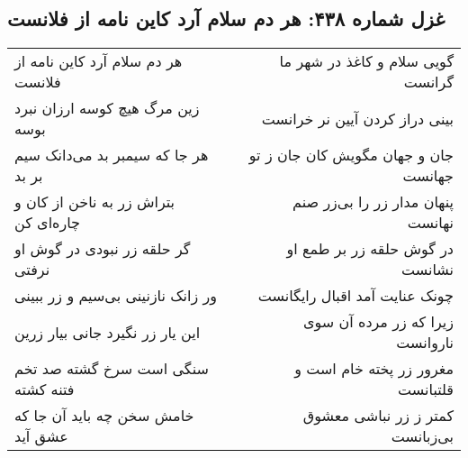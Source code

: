 \begin{center}
\section*{غزل شماره ۴۳۸: هر دم سلام آرد کاین نامه از فلانست}
\label{sec:0438}
\begin{longtable}{l p{0.5cm} r}
هر دم سلام آرد کاین نامه از فلانست
&&
گویی سلام و کاغذ در شهر ما گرانست
\\
زین مرگ هیچ کوسه ارزان نبرد بوسه
&&
بینی دراز کردن آیین نر خرانست
\\
هر جا که سیمبر بد می‌دانک سیم بر بد
&&
جان و جهان مگویش کان جان ز تو جهانست
\\
بتراش زر به ناخن از کان و چاره‌ای کن
&&
پنهان مدار زر را بی‌زر صنم نهانست
\\
گر حلقه زر نبودی در گوش او نرفتی
&&
در گوش حلقه زر بر طمع او نشانست
\\
ور زانک نازنینی بی‌سیم و زر ببینی
&&
چونک عنایت آمد اقبال رایگانست
\\
این یار زر نگیرد جانی بیار زرین
&&
زیرا که زر مرده آن سوی ناروانست
\\
سنگی است سرخ گشته صد تخم فتنه کشته
&&
مغرور زر پخته خام است و قلتبانست
\\
خامش سخن چه باید آن جا که عشق آید
&&
کمتر ز زر نباشی معشوق بی‌زبانست
\\
\end{longtable}
\end{center}

